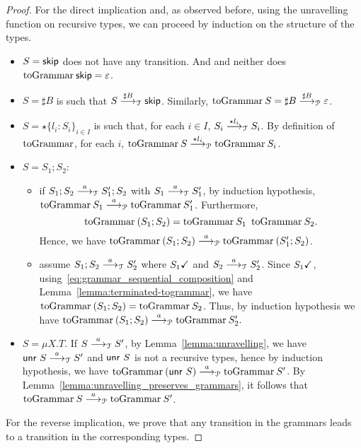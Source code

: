 \begin{proof}
	For the direct implication and, as observed before, 
	using the unravelling
	function on recursive types, we can proceed by induction
	on the structure of the types.
	
	\begin{itemize}
		\item $S=\skipk$ does not have any transition. And
		and neither does $\toGrammarf{\skipk} = \varepsilon$.
		\item $S=\sharp B$ is such that $S \LTSderives[\sharp B] \skipk$.
		Similarly, $\toGrammarf{S} = \sharp B \LTSderivesP[\sharp B] \varepsilon$.
		\item $S=\star\{l_i\colon S_i\}_{i\in I}$ is such that, for each $i\in I$,
		$S_i \LTSderives[\star l_i] S_i$. By definition of $\toGrammark$, for each $i$, 
		$\toGrammarf{S} \LTSderivesP[\star l_i] \toGrammarf{S_i}$.
		\item $S=S_1;S_2$:
		\begin{itemize}
			\item if $S_1;S_2\LTSderives S_1';S_2$ with $S_1\LTSderives S_1'$,
			by induction hypothesis, $\toGrammarf{ S_1} \LTSderivesP \toGrammarf{S_1'}$.
			Furthermore, 
			\begin{equation}
			\label{eq:grammar_sequential_composition}
				\toGrammarf{(S_1;S_2)} = \toGrammarf{S_1}\enspace\toGrammarf{S_2}.	
			\end{equation}
			Hence, we have $\toGrammarf{(S_1;S_2)} \LTSderivesP \toGrammarf{(S_1';S_2)}$.
			\item assume $S_1;S_2\LTSderives S_2'$ where 
				$\DONE{S_1}$ and
				$S_2\LTSderives S_2'$.
			Since $\DONE{S_1}$, 
			using~\eqref{eq:grammar_sequential_composition} and
			Lemma~\ref{lemma:terminated-togrammar}, 
			we have $\toGrammarf{(S_1;S_2)} = \toGrammarf{S_2}$.
			Thus, by induction hypothesis we have 
			$\toGrammarf{(S_1;S_2)} \LTSderivesP \toGrammarf{S_2'}.$
		\end{itemize}
		\item $S=\mu X.T$. If $S\LTSderives S'$, by Lemma~\ref{lemma:unravelling},
		we have $\Unravel\ S \LTSderives S'$ and $\Unravel\ S$ is not a recursive
		types, hence by induction hypothesis, we have
		$\toGrammarf{(\Unravel\ S)}\LTSderivesP \toGrammarf{S'}$.
		By Lemma~\ref{lemma:unravelling_preserves_grammars},
		it follows that
		$\toGrammarf{S}\LTSderivesP \toGrammarf{S'}$.\smallskip
	\end{itemize}
	For the reverse implication, we prove that any transition in the
	grammars leads to a transition in the corresponding types.

\end{proof}
